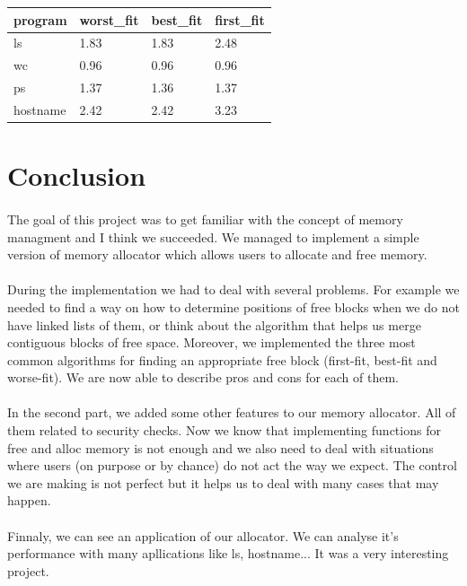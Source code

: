\documentclass[a4paper,10pt]{article}
\begin{document}
\begin{tabular}{|R{2cm}|C{1.5cm}|L{1.5cm}|L{1.5cm}|}
\hline {}program & worst\_fit & best\_fit & first\_fit \\
\hline  ls & 1.83 & 1.83 & 2.48 \\
\hline  wc & 0.96 & 0.96 & 0.96 \\
\hline  ps & 1.37 & 1.36 & 1.37 \\
\hline  hostname & 2.42 & 2.42 & 3.23 \\
\hline 
\end{tabular}

\section{Conclusion}
\paragraph{}
The goal of this project was to get familiar with the concept of memory 
managment and I think we succeeded. We managed to implement a simple 
version of memory allocator which allows users to allocate and free memory.
\paragraph{} 
During the implementation we had to deal with several problems. For 
example we needed to find a way on how to determine positions of free 
blocks when we do not have linked lists of them, or think about the 
algorithm that helps us merge contiguous blocks of free space. Moreover, 
we implemented the three most common algorithms for finding an appropriate 
free block (first-fit, best-fit and worse-fit). We are now able to describe 
pros and cons for each of them.
\paragraph{}
In the second part, we added some other features to our memory allocator. 
All of them related to security checks. Now we know that implementing 
functions for free and alloc memory is not enough and we also need 
to deal with situations where users (on purpose or by chance) do not act the 
way we expect. The control we are making is not perfect but it helps 
us to deal with many cases that may happen.

\paragraph{}
Finnaly, we can see an application of our allocator. We can analyse it's
performance with many apllications like ls, hostname... It was a very 
interesting project.

 
\end{document}
